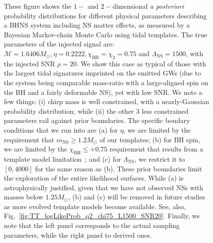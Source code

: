 \documentclass[aps,prd,amsmath,floats,floatfix, twocolumn,
superscriptaddress,nofootinbib,showpacs]{revtex4-1}
\newcommand{\lambdans}{\Lambda_\mathrm{NS}}
\newcommand{\chibh}{\chi_\mathrm{BH}}
\begin{document}
\begin{figure}
\caption{These figure shows the $1-$ and $2-$dimensional 
\textit{a posteriori} probability distributions 
for different physical parameters describing a BHNS system including NS matter 
effects, as measured by a Bayesian Markov-chain Monte Carlo using tidal templates.
The true parameters of the injected signal are: 
$\mathcal{M}=1.6406M_\odot, \eta=0.2222, \chibh=\chi_2=0.75$ and $\lambdans=1500$,
with the injected SNR $\rho=20$. We show this case as typical of those with the largest
tidal signatures imprinted on the emitted GWs (due to the system being comparable
mass-ratio with a large-aligned spin on the BH and a fairly deformable NS), yet 
with low SNR.
% 
We note a few things:
(i) chirp mass is well constrained, with a nearly-Gaussian probability distribution;
while (ii) the other $3$ less constrained parameters rail against
prior boundaries. The specific boudary conditions that we run into are (a) for $\eta$,
we are limited by the requirement that $m_\mathrm{NS}\geq 1.2M_\odot$ 
of our templates; (b) for BH spin, we are limited by the $\chibh\leq+0.75$ requirement
that results from a template model limitation~\cite{Lackey:2013axa}; and (c) for 
$\lambdans$, we
restrict it to $[0, 4000]$ for the same reason as (b). These prior boundaries
limit the exploration of the entire likelihood surfaces. While (a) is astrophysically
justified, given that we have not observed NSs with masses below 
$1.25M_\odot$, (b) and (c) will be removed in future studies as more evolved template
models become available. See, also, Fig.~\ref{fig:TT_logLikeProb_q2_chi75_L1500_SNR20}.
% 
Finally, we note that the left panel corresponds to the actual sampling parameters,
while the right panel to derived ones.
}
\label{fig:TT_pdf_q2_chi75_L1500_SNR20}
\end{figure}
%
\end{document}
